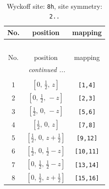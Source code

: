 \documentclass[fleqn,8pt]{jsarticle}
\begin{document}
\begin{longtable}{ccc}
\caption{Wyckoff site: {\tt 8h}, site symmetry: {\tt 2..}}
 \\
 \hline \hline
No. & position & mapping \\ \hline \endfirsthead

\multicolumn{2}{l}{\tablename\ \thetable{}} \\
 \hline \hline
No. & position & mapping \\ \hline \endhead

 \hline \hline
\multicolumn{2}{r}{\footnotesize\it continued ...} \\ \endfoot

 \hline \hline
\multicolumn{2}{r}{} \\ \endlastfoot

1 & $\left[ 0,\, \frac{1}{2},\, z \right]$ & {\tt [1,4]} \\ \hline
2 & $\left[ 0,\, \frac{1}{2},\, - z \right]$ & {\tt [2,3]} \\ \hline
3 & $\left[ \frac{1}{2},\, 0,\, - z \right]$ & {\tt [5,6]} \\ \hline
4 & $\left[ \frac{1}{2},\, 0,\, z \right]$ & {\tt [7,8]} \\ \hline
5 & $\left[ \frac{1}{2},\, 0,\, z + \frac{1}{2} \right]$ & {\tt [9,12]} \\ \hline
6 & $\left[ \frac{1}{2},\, 0,\, \frac{1}{2} - z \right]$ & {\tt [10,11]} \\ \hline
7 & $\left[ 0,\, \frac{1}{2},\, \frac{1}{2} - z \right]$ & {\tt [13,14]} \\ \hline
8 & $\left[ 0,\, \frac{1}{2},\, z + \frac{1}{2} \right]$ & {\tt [15,16]} \\
\end{longtable}
\renewcommand{\arraystretch}{1.2}
\end{document}
